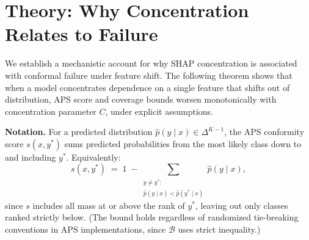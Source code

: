 \documentclass{uai2026} %
\begin{document}
\section{Theory: Why Concentration Relates to Failure}\label{sec:theory}

We establish a mechanistic account for why SHAP concentration is associated with conformal failure under feature shift. The following theorem shows that when a model concentrates dependence on a single feature that shifts out of distribution, APS score and coverage bounds worsen monotonically with concentration parameter $C$, under explicit assumptions.

\textbf{Notation.} For a predicted distribution $\hat{p}(y \mid x) \in \Delta^{K-1}$, the APS conformity score $s(x,y^*)$ sums predicted probabilities from the most likely class down to and including $y^*$. Equivalently:
\begin{equation}\label{eq:aps_equiv}
s(x, y^*) \;=\; 1 \;-\!\!\!\!\sum_{\substack{y \neq y^* :\\ \hat{p}(y \mid x) < \hat{p}(y^* \mid x)}}\!\!\!\! \hat{p}(y \mid x),
\end{equation}
since $s$ includes all mass at or above the rank of $y^*$, leaving out only classes ranked strictly below. (The bound holds regardless of randomized tie-breaking conventions in APS implementations, since $\mathcal{B}$ uses strict inequality.)
\end{document}
